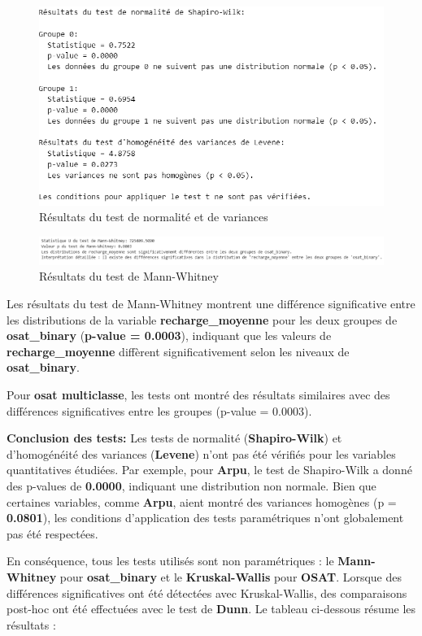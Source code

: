 \begin{figure}[H]
    \centering
    \includegraphics[width=0.8\linewidth]{capture_sas_42.png}
    \caption{Résultats du test de normalité et de variances}
\end{figure}

\begin{figure}[H]
    \centering
    \includegraphics[width=0.8\linewidth]{capture_sas_43.png}
    \caption{Résultats du test de Mann-Whitney}
\end{figure}

Les résultats du test de Mann-Whitney montrent une différence significative entre les distributions de la variable \textbf{recharge\_moyenne} pour les deux groupes de \textbf{osat\_binary} (\textbf{p-value = 0.0003}), indiquant que les valeurs de \textbf{recharge\_moyenne} diffèrent significativement selon les niveaux de \textbf{osat\_binary}.

Pour \textbf{osat multiclasse}, les tests ont montré des résultats similaires avec des différences significatives entre les groupes (p-value = 0.0003).

\textbf{Conclusion des tests:} Les tests de normalité (\textbf{Shapiro-Wilk}) et d'homogénéité des variances (\textbf{Levene}) n'ont pas été vérifiés pour les variables quantitatives étudiées. Par exemple, pour \textbf{Arpu}, le test de Shapiro-Wilk a donné des p-values de \textbf{0.0000}, indiquant une distribution non normale. Bien que certaines variables, comme \textbf{Arpu}, aient montré des variances homogènes (p = \textbf{0.0801}), les conditions d'application des tests paramétriques n'ont globalement pas été respectées.

En conséquence, tous les tests utilisés sont non paramétriques : le \textbf{Mann-Whitney} pour \textbf{osat\_binary} et le \textbf{Kruskal-Wallis} pour \textbf{OSAT}. Lorsque des différences significatives ont été détectées avec Kruskal-Wallis, des comparaisons post-hoc ont été effectuées avec le test de \textbf{Dunn}. Le tableau ci-dessous résume les résultats :

